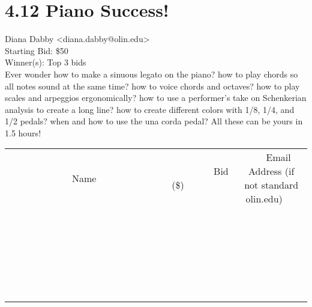 \documentclass[11pt]{article}
\begin{document}
					\section*{4.12 Piano Success!}
					Diana Dabby <diana.dabby@olin.edu> \\
					Starting Bid: \$50 \\
					Winner(s): Top 3 bids \\
					Ever wonder how to make a sinuous legato on the piano?  how to play chords so all notes sound at the same time?  how to voice chords and octaves?  how to play scales and arpeggios ergonomically?  how to use a performer's take on Schenkerian analysis to create a long line?  how to create different colors with 1/8, 1/4, and 1/2 pedals?  when and how to use the una corda pedal?  All these can be yours in 1.5 hours! \\
					[6ex]
					\begin{tabular}{c c c}
						~~~~~~~~~~~~~Name~~~~~~~~~~~~~ & ~~~~~~~~~Bid (\$)~~~~~~~~~ & ~~~Email Address (if not standard olin.edu)~~~ \\
				
 & & \\
\hline
 & & \\
\hline
 & & \\
\hline
 & & \\
\hline
 & & \\
\hline
 & & \\
\hline
 & & \\
\hline
 & & \\
\hline
 & & \\
\hline
 & & \\
\hline
 & & \\
\hline
 & & \\
\hline
 & & \\
\hline
 & & \\
\hline
 & & \\
\hline
 & & \\
\hline
 & & \\
\hline
 & & \\
\hline
 & & \\
\hline
 & & \\
\hline
 & & \\
\hline
 & & \\
\hline
 & & \\
\hline
 & & \\
\hline
 & & \\
\hline
 & & \\
\hline
					\end{tabular}
					\clearpage
				
\end{document}
